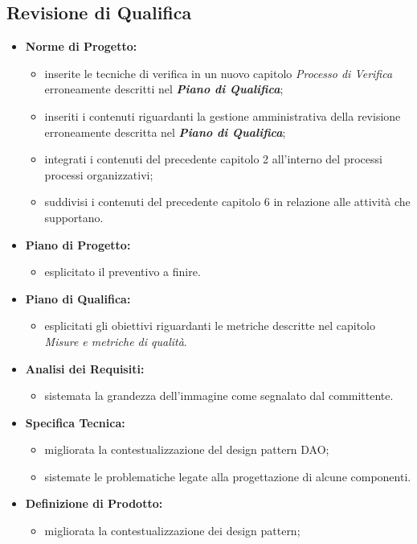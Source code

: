 \subsection{Revisione di Qualifica}
\begin{itemize}
\item \textbf{Norme di Progetto:}
	\begin{itemize}
		\item inserite le tecniche di verifica in un nuovo capitolo \textit{Processo di Verifica} erroneamente descritti nel \textit{\textbf{Piano di Qualifica}};
		\item inseriti i contenuti riguardanti la gestione amministrativa della revisione erroneamente descritta nel \textit{\textbf{Piano di Qualifica}};
		\item integrati i contenuti del precedente capitolo 2 all'interno del processi processi organizzativi;
		\item suddivisi i contenuti del precedente capitolo 6 in relazione alle attività che supportano.	
	\end{itemize}
\item \textbf{Piano di Progetto:}
	\begin{itemize}
		\item esplicitato il preventivo a finire.
	\end{itemize}
\item \textbf{Piano di Qualifica:}
	\begin{itemize}
		\item esplicitati gli obiettivi riguardanti le metriche descritte nel capitolo \textit{Misure e metriche di qualità}.
	\end{itemize}
\item \textbf{Analisi dei Requisiti:}
	\begin{itemize}
		\item sistemata la grandezza dell'immagine come segnalato dal committente.
	\end{itemize}
\item  \textbf{Specifica Tecnica:}
	\begin{itemize}
		\item migliorata la contestualizzazione del design pattern\glossario{} DAO;
		\item sistemate le problematiche legate alla progettazione di alcune componenti.
	\end{itemize}
\item  \textbf{Definizione di Prodotto:}
	\begin{itemize}
		\item migliorata la contestualizzazione dei design pattern\glossario{};

\end{itemize}
\end{itemize}
